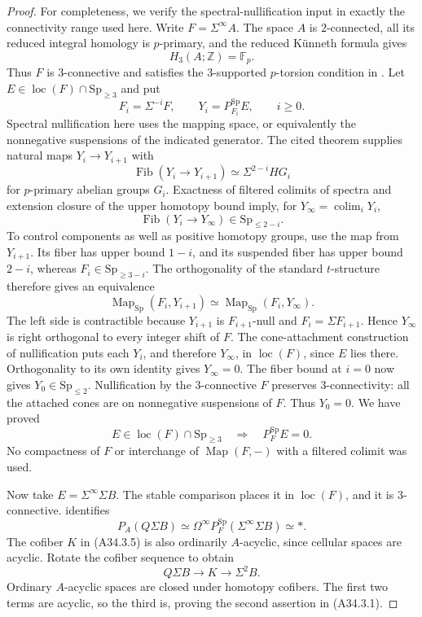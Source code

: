 \begin{proof}
For completeness, we verify the spectral-nullification input in
exactly the connectivity range used here.  Write $F=\Sigma^\infty A$.
The space $A$ is $2$-connected, all its reduced integral homology is
$p$-primary, and the reduced K\"unneth formula gives
\[
                  H_3(A;\mathbb Z)=\mathbb F_p.
\]
Thus $F$ is $3$-connective and satisfies the $3$-supported
$p$-torsion condition in
\citet[Theorem~2.6]{ABousfield1996}.  Let
$E\in\operatorname{loc}(F)\cap\mathrm{Sp}_{\geq3}$ and put
\[
 F_i=\Sigma^{-i}F,
 \qquad Y_i=P^{\mathrm{Sp}}_{F_i}E,
 \qquad i\geq0.
\]
Spectral nullification here uses the mapping space, or equivalently
the nonnegative suspensions of the indicated generator.  The cited
theorem supplies natural maps $Y_i\to Y_{i+1}$ with
\[
          \operatorname{Fib}(Y_i\to Y_{i+1})
                 \simeq\Sigma^{2-i}HG_i
 \tag{A34.3.6}
\]
for $p$-primary abelian groups $G_i$.  Exactness of filtered colimits
of spectra and extension closure of the upper homotopy bound imply,
for $Y_\infty=\operatorname*{colim}_iY_i$,
\[
        \operatorname{Fib}(Y_i\to Y_\infty)
                    \in\mathrm{Sp}_{\leq2-i}.
\]
To control components as well as positive homotopy groups, use the
map from $Y_{i+1}$.  Its fiber has upper bound $1-i$, and its
suspended fiber has upper bound $2-i$, whereas
$F_i\in\mathrm{Sp}_{\geq3-i}$.  The orthogonality of the standard
$t$-structure therefore gives an equivalence
\[
 \operatorname{Map}_{\mathrm{Sp}}(F_i,Y_{i+1})
       \simeq\operatorname{Map}_{\mathrm{Sp}}(F_i,Y_\infty).
\]
The left side is contractible because $Y_{i+1}$ is $F_{i+1}$-null
and $F_i=\Sigma F_{i+1}$.  Hence $Y_\infty$ is right orthogonal to
every integer shift of $F$.  The cone-attachment construction of
nullification puts each $Y_i$, and therefore $Y_\infty$, in
$\operatorname{loc}(F)$, since $E$ lies there.  Orthogonality to its
own identity gives $Y_\infty=0$.  The fiber bound at $i=0$ now gives
$Y_0\in\mathrm{Sp}_{\leq2}$.  Nullification by the $3$-connective
$F$ preserves $3$-connectivity: all the attached cones are on
nonnegative suspensions of $F$.  Thus $Y_0=0$.  We have proved
\[
 E\in\operatorname{loc}(F)\cap\mathrm{Sp}_{\geq3}
       \quad\Longrightarrow\quad P_F^{\mathrm{Sp}}E=0.
 \tag{A34.3.7}
\]
No compactness of $F$ or interchange of
$\operatorname{Map}(F,-)$ with a filtered colimit was used.

Now take $E=\Sigma^\infty\Sigma B$.  The stable comparison places
it in $\operatorname{loc}(F)$, and it is $3$-connective.
\citet[Theorem~2.10]{ABousfield1996} identifies
\[
 P_A(Q\Sigma B)
  \simeq\Omega^\infty P_F^{\mathrm{Sp}}
                      (\Sigma^\infty\Sigma B)
  \simeq *.
 \tag{A34.3.8}
\]
The cofiber $K$ in \textup{(A34.3.5)} is also ordinarily
$A$-acyclic, since cellular spaces are acyclic.  Rotate the cofiber
sequence to obtain
\[
                     Q\Sigma B\longrightarrow K
                                \longrightarrow\Sigma^2B.
\]
Ordinary $A$-acyclic spaces are closed under homotopy cofibers.
The first two terms are acyclic, so the third is, proving the
second assertion in \textup{(A34.3.1)}.


\end{proof}
